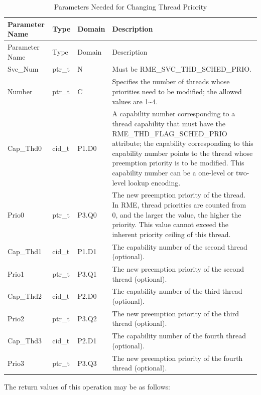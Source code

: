 \begin{xltabular}{\textwidth}{@{}>{\hsize\raggedright\arraybackslash}X>{\hsize\raggedright\arraybackslash}X>{\hsize\raggedright\arraybackslash}X>{\hsize\raggedright\arraybackslash}X@{}}
\caption{Parameters Needed for Changing Thread Priority}\label{tab:4-30-change-thread-priority-parameters}\\
\toprule
Parameter Name & Type & Domain & Description\tabularnewline
\endfirsthead
\toprule
Parameter Name & Type & Domain & Description\tabularnewline
\midrule
\endhead
\bottomrule
\endlastfoot
Svc\_Num & ptr\_t & N & Must be RME\_SVC\_THD\_SCHED\_PRIO.\tabularnewline
Number & ptr\_t & C &
Specifies the number of threads whose priorities need to be modified; the allowed values are 1\textasciitilde4.\tabularnewline
Cap\_Thd0 & cid\_t & P1.D0 &
A capability number corresponding to a thread capability that must have the RME\_THD\_FLAG\_SCHED\_PRIO attribute; the capability corresponding to this capability number points to the thread whose preemption priority is to be modified. This capability number can be a one-level or two-level lookup encoding.\tabularnewline
Prio0 & ptr\_t & P3.Q0 &
The new preemption priority of the thread. In RME, thread priorities are counted from 0, and the larger the value, the higher the priority. This value cannot exceed the inherent priority ceiling of this thread.\tabularnewline
Cap\_Thd1 & cid\_t & P1.D1 & The capability number of the second thread (optional).\tabularnewline
Prio1 & ptr\_t & P3.Q1 &
The new preemption priority of the second thread (optional).\tabularnewline
Cap\_Thd2 & cid\_t & P2.D0 & The capability number of the third thread (optional).\tabularnewline
Prio2 & ptr\_t & P3.Q2 &
The new preemption priority of the third thread (optional).\tabularnewline
Cap\_Thd3 & cid\_t & P2.D1 & The capability number of the fourth thread (optional).\tabularnewline
Prio3 & ptr\_t & P3.Q3 &
The new preemption priority of the fourth thread (optional).\tabularnewline
\end{xltabular}
\nopagebreak[4]

The return values of this operation may be as follows:


